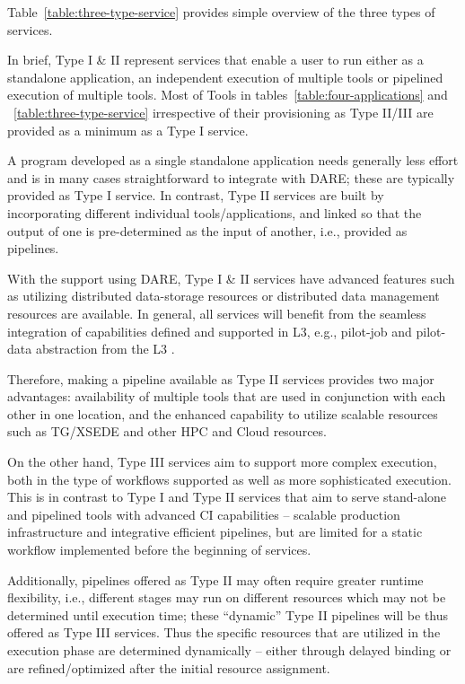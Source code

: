 \documentclass[]{svjour3}
\begin{document}
Table~\ref{table:three-type-service} provides simple overview of the
three types of services.

In brief, Type I \& II represent services that enable a user to run
either as a standalone application, an independent execution of
multiple tools or pipelined execution of multiple tools. Most of Tools
in tables~\ref{table:four-applications} and
~\ref{table:three-type-service} irrespective of their provisioning as
Type II/III are provided as a minimum as a Type I service.

A program developed as a single standalone application needs generally
less effort and is in many cases straightforward to integrate with
DARE; these are typically provided as Type I service. In contrast,
Type II services are built by incorporating different individual
tools/applications, and linked so that the output of one is
pre-determined as the input of another, i.e., provided as pipelines.

With the support using DARE, Type I \& II services have advanced
features such as utilizing distributed data-storage resources or
distributed data management resources are available. In general, all
services will benefit from the seamless integration of capabilities
defined and supported in L3, e.g., pilot-job and pilot-data
abstraction from the L3 \cite{pstar11}.

Therefore, making a pipeline available as Type II services provides
two major advantages: availability of multiple tools that are used in
conjunction with each other in one location, and the enhanced
capability to utilize scalable resources such as TG/XSEDE and other
HPC and Cloud resources.

On the other hand, Type III services aim to support more complex
execution, both in the type of workflows supported as well as more
sophisticated execution. This is in contrast to Type I and Type II
services that aim to serve stand-alone and pipelined tools with
advanced CI capabilities -- scalable production infrastructure and
integrative efficient pipelines, but are limited for a static workflow
implemented before the beginning of services.

Additionally, pipelines offered as Type II may often require greater
runtime flexibility, i.e., different stages may run on different
resources which may not be determined until execution time; these
``dynamic'' Type II pipelines will be thus offered as Type III
services. Thus the specific resources that are utilized in the
execution phase are determined dynamically -- either through delayed
binding or are refined/optimized after the initial resource
assignment.
\end{document}
